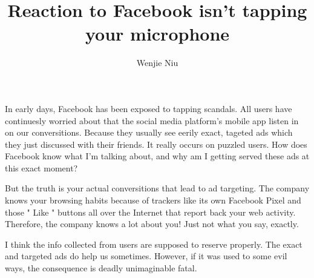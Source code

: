\documentclass{article}
\author{Wenjie Niu}
\title{Reaction to Facebook isn’t tapping your microphone}
\begin{document}
\maketitle
In early days, Facebook has been exposed to tapping scandals. All  users have continuesly worried about that the social media platform's mobile app listen in on our conversitions. Because they usually see eerily exact, tageted ads which they just discussed with their friends. It really occurs on puzzled users. How does Facebook know what I'm talking about, and why am I getting served these ads at this exact moment? 

But the truth is your actual conversitions that lead to ad targeting. The company knows your browsing habits because of trackers like its own Facebook Pixel and those " Like " buttons all over the Internet that report back your web activity. Therefore, the company knows a lot about you! Just not what you say, exactly.

I think the info collected from users are supposed to reserve properly. The exact and targeted ads do help us sometimes. However, if it was used to some evil ways, the consequence is  deadly unimaginable fatal.
\end{document}
